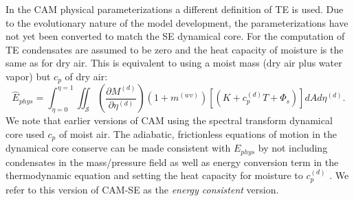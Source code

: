 \documentclass{agujournal}
\newcommand*{\gi}[1]{\widehat{#1}}
\begin{document}
In the CAM physical parameterizations a different definition of TE is used. Due to the evolutionary nature of the model development, the parameterizations have not yet been converted to match the SE dynamical core. For the computation of TE condensates are assumed to be zero and the heat capacity of moisture is the same as for dry air. This is equivalent to using a moist mass (dry air plus water vapor) but $c_p$ of dry air:
\begin{equation}
\label{eq:Ephys}
\gi{E}_{phys} =\int_{\eta=0}^{\eta=1} \iint_\mathcal{S} \left( \frac{\partial M^{(d)}}{\partial \eta^{(d)}} \right)\left(1+m^{(wv)}\right)\left[ \left(K+c_p^{(d)}T+\Phi_s\right)\right]dA d \eta^{(d)}.
\end{equation}
We note that earlier versions of CAM using the spectral transform dynamical core used $c_p$ of moist air. The adiabatic, frictionless equations of motion in the dynamical core conserve can be made consistent with $E_{phys}$ by not including condensates in the mass/pressure field as well as energy conversion term in the thermodynamic equation and setting the heat capacity for moisture to $c_p^{(d)}$ \citep{T2011LNCSEb}. We refer to this version of CAM-SE as the {\em{energy consistent}} version.
\end{document}
